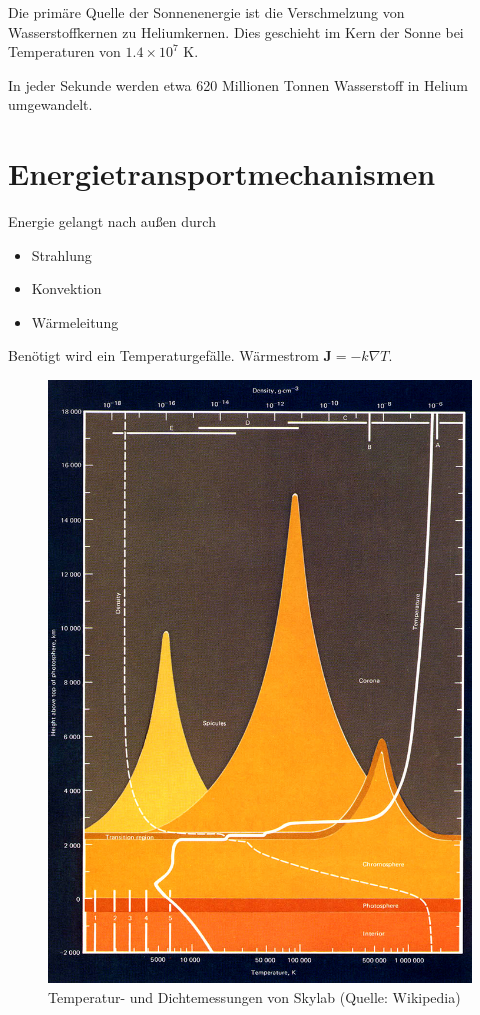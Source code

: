 \documentclass[
  a4paper,
  DIV=11]{scrreprt}
\providecommand{\tightlist}{%
  \setlength{\itemsep}{0pt}\setlength{\parskip}{0pt}}\usepackage{longtable,booktabs,array}
\begin{document}
Die primäre Quelle der Sonnenenergie ist die Verschmelzung von
Wasserstoffkernen zu Heliumkernen. Dies geschieht im Kern der Sonne bei
Temperaturen von \(1.4 \times 10^7\) K.

In jeder Sekunde werden etwa 620 Millionen Tonnen Wasserstoff in Helium
umgewandelt.

\hypertarget{energietransportmechanismen}{%
\section{Energietransportmechanismen}\label{energietransportmechanismen}}

Energie gelangt nach außen durch

\begin{itemize}
\tightlist
\item
  Strahlung
\item
  Konvektion
\item
  Wärmeleitung
\end{itemize}

Benötigt wird ein Temperaturgefälle. Wärmestrom
\(\mathbf J = -k \nabla T\).

\begin{figure}

{\centering \includegraphics{./images/paste-7A6CEC06.png}

}

\caption{\label{fig-skylab}Temperatur- und Dichtemessungen von Skylab
(Quelle: Wikipedia)}

\end{figure}
\end{document}
